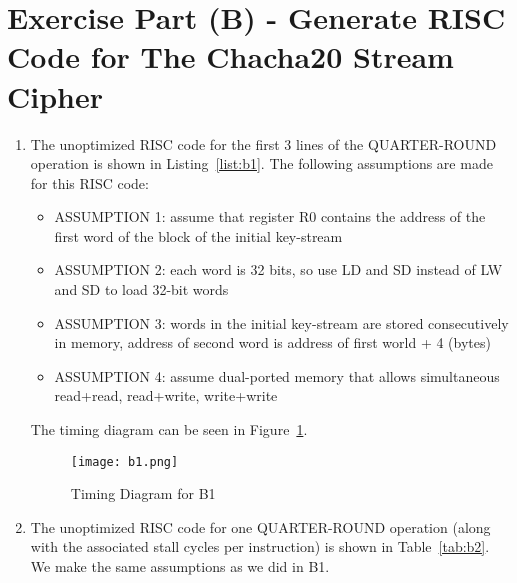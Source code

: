 \section*{Exercise Part (B) - Generate RISC Code for The Chacha20 Stream Cipher}

\begin{enumerate}[wide, label=(B\arabic*)]

\item The unoptimized RISC code for the first 3 lines of the QUARTER-ROUND operation is shown in Listing~\ref{list:b1}. The following assumptions are made for this RISC code:
\begin{itemize}
	\item ASSUMPTION 1: assume that register R0 contains the address of the first word of the block of the initial key-stream
	\item ASSUMPTION 2: each word is 32 bits, so use LD and SD instead of LW and SD to load 32-bit words
	\item ASSUMPTION 3: words in the initial key-stream are stored consecutively in memory, address of second word is address of first world + 4 (bytes)
	\item ASSUMPTION 4: assume dual-ported memory that allows simultaneous read+read, read+write, write+write
\end{itemize}

The timing diagram can be seen in Figure~\ref{fig:B1}. %

\begin{figure}[htp]
    \centering
    \texttt{[image: b1.png]}
    \caption{\label{fig:B1}Timing Diagram for B1}
\end{figure}

\item The unoptimized RISC code for one QUARTER-ROUND operation (along with the associated stall cycles per instruction) is shown in Table~\ref{tab:b2}. We make the same assumptions as we did in B1.



\end{enumerate}
